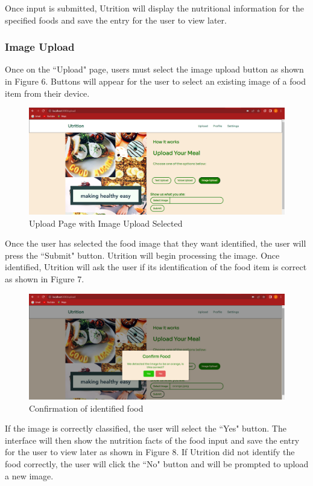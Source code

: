 \documentclass{article}
\begin{document}
Once input is submitted, Utrition will display the nutritional information for the specified foods and save the entry for the user to view later.

\subsubsection{Image Upload}
Once on the ``Upload" page, users must select the image upload button as shown in Figure 6. Buttons will appear for the user to select an existing image of a food item from their device.

\begin{figure}[H]
	\centering
	\includegraphics[scale=0.30]{imageupload.png}
	\caption{Upload Page with Image Upload Selected}
\end{figure}

Once the user has selected the food image that they want identified, the user will press the ``Submit" button. Utrition will begin processing the image. Once identified, Utrition will ask the user if its identification of the food item is correct as shown in Figure 7. 

\begin{figure}[H]
	\centering
	\includegraphics[scale=0.30]{confirmimage.png}
	\caption{Confirmation of identified food}
\end{figure}

If the image is correctly classified, the user will select the ``Yes" button. The interface will then show the nutrition facts of the food input and save the entry for the user to view later as shown in Figure 8. If Utrition did not identify the food correctly, the user will click the ``No" button and will be prompted to upload a new image.
\end{document}

